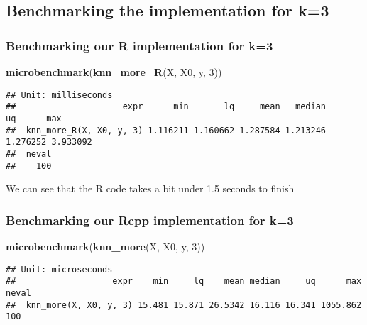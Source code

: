 \documentclass[]{article}
\newenvironment{Shaded}{\begin{snugshade}}{\end{snugshade}}
\newcommand{\DecValTok}[1]{\textcolor[rgb]{0.00,0.00,0.81}{#1}}
\newcommand{\KeywordTok}[1]{\textcolor[rgb]{0.13,0.29,0.53}{\textbf{#1}}}
\newcommand{\NormalTok}[1]{#1}
\begin{document}
\hypertarget{benchmarking-the-implementation-for-k3}{%
\subsection{Benchmarking the implementation for
k=3}\label{benchmarking-the-implementation-for-k3}}

\hypertarget{benchmarking-our-r-implementation-for-k3}{%
\subsubsection{Benchmarking our R implementation for
k=3}\label{benchmarking-our-r-implementation-for-k3}}

\begin{Shaded}
\begin{Highlighting}[]
\KeywordTok{microbenchmark}\NormalTok{(}\KeywordTok{knn_more_R}\NormalTok{(X, X0, y, }\DecValTok{3}\NormalTok{))}
\end{Highlighting}
\end{Shaded}

\begin{verbatim}
## Unit: milliseconds
##                     expr      min       lq     mean   median       uq      max
##  knn_more_R(X, X0, y, 3) 1.116211 1.160662 1.287584 1.213246 1.276252 3.933092
##  neval
##    100
\end{verbatim}

We can see that the R code takes a bit under 1.5 seconds to finish

\hypertarget{benchmarking-our-rcpp-implementation-for-k3}{%
\subsubsection{Benchmarking our Rcpp implementation for
k=3}\label{benchmarking-our-rcpp-implementation-for-k3}}

\begin{Shaded}
\begin{Highlighting}[]
\KeywordTok{microbenchmark}\NormalTok{(}\KeywordTok{knn_more}\NormalTok{(X, X0, y, }\DecValTok{3}\NormalTok{))}
\end{Highlighting}
\end{Shaded}

\begin{verbatim}
## Unit: microseconds
##                   expr    min     lq    mean median     uq      max neval
##  knn_more(X, X0, y, 3) 15.481 15.871 26.5342 16.116 16.341 1055.862   100
\end{verbatim}
\end{document}
